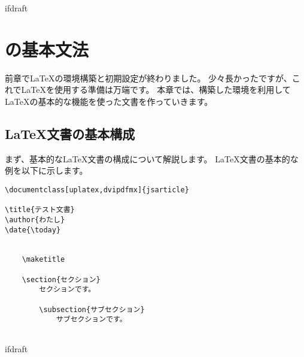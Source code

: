 \expandafter\ifx\csname ifdraft\endcsname\relax
    
    \graphicspath{{./figure/}}

\fi

\chapter{\logoLaTeX の基本文法}
    前章で\LaTeX の環境構築と初期設定が終わりました。
    少々長かったですが、これで\LaTeX を使用する準備は万端です。
    本章では、構築した環境を利用して\LaTeX の基本的な機能を使った文書を作っていきます。

    \section{\LaTeX 文書の基本構成}
        まず、基本的な\LaTeX 文書の構成について解説します。
        \LaTeX 文書の基本的な例を以下に示します。
        
        \begin{verbatim}
\documentclass[uplatex,dvipdfmx]{jsarticle}

\title{テスト文書}
\author{わたし}
\date{\today}


    \maketitle

    \section{セクション}
        セクションです。

        \subsection{サブセクション}
            サブセクションです。


        \end{verbatim}


            \expandafter\ifx\csname ifdraft\endcsname\relax

\fi